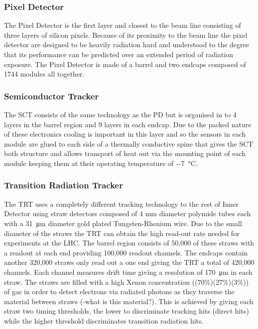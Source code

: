 		\subsubsection*{Pixel Detector} 

		The Pixel Detector is the first layer and closest to the beam line consisting of three layers of silicon pixels. Because of its proximity to the beam line the pixel detector are designed to be heavily radiation hard and understood to the degree that its performance can be predicted over an extended period of radiation exposure. The Pixel Detector is made of a barrel and two endcaps composed of 1744 modules all together. \\


		\subsubsection*{Semiconductor Tracker}

		The SCT consists of the same technology as the PD but is organised in to 4 layers in the barrel region and 9 layers in each endcap. Due to the packed nature of these electronics cooling is important in this layer and so the sensors in each module are glued to each side of a thermally conductive spine that gives the SCT both structure and allows transport of heat out via the mounting point of each module keeping them at their operating temperature of \SI{-7}{\degreeCelsius}.\\



		\subsubsection*{Transition Radiation Tracker}

		The TRT uses a completely different tracking technology to the rest of Inner Detector using straw detectors composed of 4 mm diameter polymide tubes each with a \SI{31}{\um} diameter gold plated Tungsten-Rhenium wire. Due to the small diameter of the straws the TRT can obtain the high read-out rate needed for experiments at the LHC. The barrel region consists of 50,000 of these straws with a readout at each end providing 100,000 readout channels. The endcaps contain another 320,000 straws only read out a one end giving the TRT a total of 420,000 channels. Each channel measures drift time giving a resolution of \SI{170}{\um} in each straw. The straws are filled with a high Xenon concentration ((70\%)(27\%)(3\%)) of gas in order to detect electrons via radiated photons as they traverse the material between straws (-what is this material?). This is achieved by giving each straw two timing thresholds, the lower to discriminate tracking hits (direct hits) while the higher threshold discriminates transition radiation hits. \\ %
		



